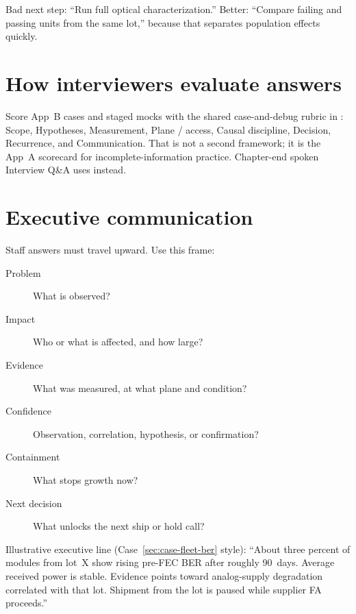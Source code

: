 Bad next step: ``Run full optical characterization.'' Better: ``Compare failing
and passing units from the same lot,'' because that separates population effects
quickly.



\section{How interviewers evaluate answers}
\label{sec:case-grading}

Score App~B cases and staged mocks with the shared case-and-debug rubric in
: Scope, Hypotheses, Measurement, Plane /
access, Causal discipline, Decision, Recurrence, and Communication. That is not
a second framework; it is the App~A scorecard for incomplete-information
practice. Chapter-end spoken Interview Q\&A uses
 instead.

\section{Executive communication}
\label{sec:case-exec-summary}

Staff answers must travel upward. Use this frame:

\begin{description}
\item[Problem] What is observed?
\item[Impact] Who or what is affected, and how large?
\item[Evidence] What was measured, at what plane and condition?
\item[Confidence] Observation, correlation, hypothesis, or confirmation?
\item[Containment] What stops growth now?
\item[Next decision] What unlocks the next ship or hold call?
\end{description}

Illustrative executive line (Case~\ref{sec:case-fleet-ber} style): ``About
three percent of modules from lot~X show rising pre-FEC BER after roughly
90~days. Average received power is stable. Evidence points toward analog-supply
degradation correlated with that lot. Shipment from the lot is paused while
supplier FA proceeds.''

